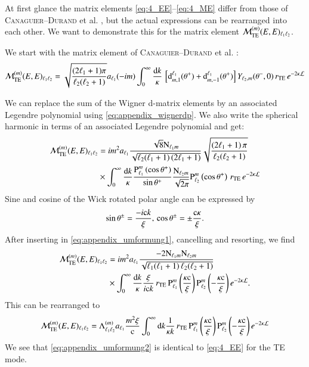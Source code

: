 At first glance the matrix elements \eqref{eq:4_EE}--\eqref{eq:4_ME} differ
from those of \textsc{Canaguier--Durand} et al. \cite{Durand,
ThermalCasimirEffect}, but the actual expressions can be rearranged into each
other. We want to demonstrate this for the matrix element
$\mathcal{M}_{\mathrm{TE}}^{(m)}(E,E)_{\ell_1\ell_2}$.

We start with the matrix element of \textsc{Canaguier--Durand} et al. \cite{Durand, ThermalCasimirEffect}:
\begin{equation}
\mathcal{M}_{\mathrm{TE}}^{(m)}(E,E)_{\ell_1\ell_2} = \sqrt{\frac{(2\ell_1+1)\pi}{\ell_2(\ell_2+1)}} a_{\ell_1} (-i m) \int_0^\infty \frac{\mathrm{d}k}{\kappa} \, \left[ \mathrm{d}^{\ell_1}_{m,1}(\theta^+) + \mathrm{d}^{\ell_1}_{m,-1}(\theta^+)\right] Y_{\ell_2,m}(\theta^-,0) \, r_{\mathrm{TE}} \, e^{-2\kappa\mathcal{L}}
\end{equation}

We can replace the sum of the Wigner d-matrix elements by an associated Legendre
polynomial using \eqref{eq:appendix_wignerdp}. We also write the spherical harmonic
in terms of an associated Legendre polynomial and get:
\begin{align}
\nonumber
\mathcal{M}_{\mathrm{TE}}^{(m)}(E,E)_{\ell_1\ell_2} &= i m^2 a_{\ell_1} \frac{\sqrt{8} \text{N}_{\ell_1 m}}{\sqrt{\ell_2(\ell_1+1)\,(2\ell_1+1)}} \sqrt{\frac{(2\ell_1+1)\,\pi}{\ell_2(\ell_2+1)}} \\
\label{eq:appendix_umformung1}
&\times \int_0^\infty \frac{\mathrm{d}k}{\kappa} \frac{{\text{P}_{\ell_1}^{m}}\left(\cos\theta^+\right)}{\sin\theta^+} \frac{\text{N}_{\ell_2 m}}{\sqrt{2\pi}} {\text{P}_{\ell_2}^{m}}\left(\cos\theta^+\right) \, r_{\mathrm{TE}} \, e^{-2\kappa\mathcal{L}}
\end{align}
Sine and cosine of the Wick rotated polar angle can be expressed by
\begin{equation}
\sin\theta^\pm = \frac{-i \mathrm{c} k}{\xi}, \\
\cos\theta^\pm = \pm\frac{\mathrm{c} \kappa}{\xi}.
\end{equation}
After inserting in \eqref{eq:appendix_umformung1}, cancelling and resorting, we find
\begin{align}
\nonumber
\mathcal{M}_{\mathrm{TE}}^{(m)}(E,E)_{\ell_1\ell_2} &= i m^2 a_{\ell_1} \frac{-2 \text{N}_{\ell_1 m} \text{N}_{\ell_2 m}}{\sqrt{\ell_1(\ell_1+1)\,\ell_2(\ell_2+1)}} \\
&\times \int_0^\infty \frac{\mathrm{d}k}{\kappa} \frac{\xi}{i\mathrm{c} k} \, r_{\mathrm{TE}} \, {\text{P}_{\ell_1}^{m}}\left(\frac{\kappa\mathrm{c}}{\xi}\right) {\text{P}_{\ell_2}^{m}}\left(-\frac{\kappa\mathrm{c}}{\xi}\right) e^{-2\kappa\mathcal{L}}.
\end{align}
This can be rearranged to
\begin{equation}
\label{eq:appendix_umformung2}
\mathcal{M}_{\mathrm{TE}}^{(m)}(E,E)_{\ell_1\ell_2} = \Lambda_{\ell_1 \ell_2}^{(m)} a_{\ell_1} \frac{m^2\xi}{\mathrm{c}}
\int_0^\infty \mathrm{d}k \frac{1}{\kappa k} \, r_{\mathrm{TE}} \, {\text{P}_{\ell_1}^{m}}\left(\frac{\kappa\mathrm{c}}{\xi}\right) {\text{P}_{\ell_2}^{m}}\left(-\frac{\kappa\mathrm{c}}{\xi}\right) e^{-2\kappa\mathcal{L}}
\end{equation}
We see that \eqref{eq:appendix_umformung2} is identical to \eqref{eq:4_EE} for the TE mode.


